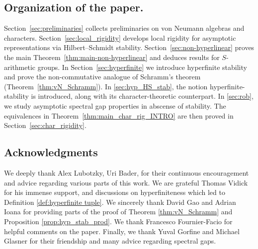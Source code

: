 \documentclass[11pt]{amsart}
\DeclareMathOperator{\SL}{SL}
\newcommand{\Z}{{\mathbb{Z}}}
\theoremstyle{definition}
\theoremstyle{remark}
\theoremstyle{definition}
\begin{document}





\subsection*{Organization of the paper.}
Section~\ref{sec:preliminaries} collects preliminaries on von Neumann algebras and characters. 
Section~\ref{sec:local_rigidity} develops local rigidity for asymptotic representations via Hilbert--Schmidt stability.
Section~\ref{sec:non-hyperlinear} proves the main Theorem~\ref{thm:main-non-hyperlinear} and deduces results for $S$-arithmetic groups.  
In Section~\ref{sec:hyperfinite} we introduce hyperfinite stability and prove the non-commutative analogue of Schramm's theorem (Theorem~\ref{thm:vN_Schramm}).  In \ref{sec:hyp_HS_stab}, the notion hyperfinite-stability is introduced, along with its character-theoretic counterpart.
In \ref{sec:rob}, we study asymptotic spectral gap properties in abscense of stability.
The equivalences in Theorem~\ref{thm:main_char_rig_INTRO} are then proved in Section~\ref{sec:char_rigidity}.  


\subsection*{Acknowledgments}
We deeply thank Alex Lubotzky, Uri Bader, for their continuous encouragement and advice regarding various parts of this work.
We are grateful Thomas Vidick for his immense support, and discussions on hyperfiniteness which led to Definition \ref{def:hyperfinite tuple}.
We sincerely thank David Gao and Adrian Ioana for providing parts of the proof of Theorem \ref{thm:vN_Schramm} and Proposition \ref{prop:hyp_stab_prod}.
We thank Francesco Fournier-Facio for helpful comments on the paper.
Finally, we thank Yuval Gorfine and Michael Glasner for their friendship and many advice regarding spectral gaps.
\end{document}
